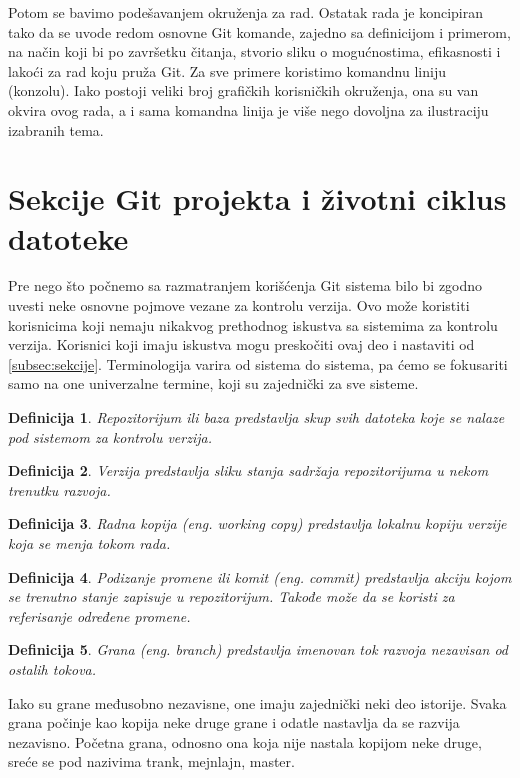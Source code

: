 \documentclass[a4paper]{article}
\newtheorem{definicija}{Definicija}[section]
\begin{document}
{Potom se bavimo podešavanjem okruženja za rad. Ostatak rada je koncipiran tako da se uvode redom osnovne Git komande, zajedno sa definicijom i primerom, na način koji bi po završetku čitanja, stvorio sliku o mogućnostima, efikasnosti i lakoći za rad koju pruža Git.
Za sve primere koristimo komandnu liniju (konzolu). Iako postoji veliki broj grafičkih korisničkih okruženja, ona su van okvira ovog rada, a i sama komandna linija je više nego dovoljna za ilustraciju izabranih tema.

\section{Sekcije Git projekta i životni ciklus datoteke}
\label{zivotni_ciklus}
Pre nego što počnemo sa razmatranjem korišćenja Git sistema bilo bi zgodno uvesti neke osnovne pojmove vezane za kontrolu verzija. Ovo može koristiti korisnicima koji nemaju nikakvog prethodnog iskustva sa sistemima za kontrolu verzija. Korisnici koji imaju iskustva mogu preskočiti ovaj deo i nastaviti od \ref{subsec:sekcije}. Terminologija varira od sistema do sistema, pa ćemo se fokusariti samo na one univerzalne termine, koji su zajednički za sve sisteme.

\begin{definicija}
Repozitorijum ili baza predstavlja skup svih datoteka koje se nalaze pod sistemom za kontrolu verzija.
\end{definicija}

\begin{definicija}
Verzija predstavlja sliku stanja sadržaja repozitorijuma u nekom trenutku razvoja.
\end{definicija}

\begin{definicija}
Radna kopija (eng. working copy) predstavlja lokalnu kopiju verzije koja se menja tokom rada.
\end{definicija}

\begin{definicija}
Podizanje promene ili komit (eng. commit) predstavlja akciju kojom se trenutno stanje zapisuje u repozitorijum. Takođe može da se koristi za referisanje određene promene.
\end{definicija}

\begin{definicija}
Grana (eng. branch) predstavlja imenovan tok razvoja nezavisan od ostalih tokova.
\end{definicija}
Iako su grane međusobno nezavisne, one imaju zajednički neki deo istorije. Svaka grana počinje kao kopija neke druge grane i odatle nastavlja da se razvija nezavisno. Početna grana, odnosno ona koja nije nastala kopijom neke druge, sreće se pod nazivima trank, mejnlajn, master.

}
\end{document}
